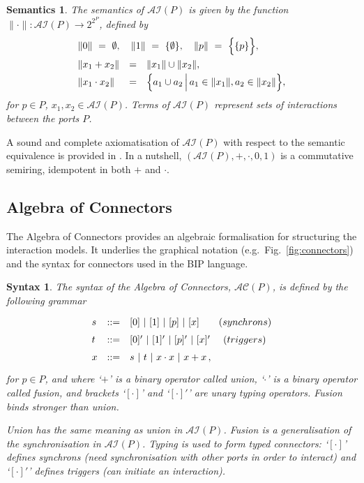 \documentclass{llncs}
\newcommand{\fig}[1]{Fig.~\ref{fig:#1}}
\newcommand{\eg}[1][\ ]{e.g.#1}
\newtheorem*{syntax}{Syntax}
\newtheorem*{semantics}{Semantics}
\newcommand{\ai}{\ensuremath{\mathcal{AI}}}
\newcommand{\ac}{\ensuremath{\mathcal{AC}}}
\begin{document}
\begin{semantics}
The semantics of $\ai(P)$ is given by the function $\|\cdot\| : \ai(P)
\rightarrow 2^{2^P}$, defined by
%
\begin{equation} \label{eq:apsem}
  \renewcommand{\arraystretch}{1.5}
  \begin{array}{lcl}
    \lefteqn{\|0\|\ =\ \emptyset,\quad \|1\|\ =\ \{\emptyset\},\quad
      \|p\|\ =\ \Big\{\{p\}\Big\},}\\
    \|x_1 + x_2\| &=& \|x_1\| \cup \|x_2\|,\\
    \|x_1 \cdot x_2\| &=& 
    \Big\{a_1 \cup a_2\,\Big|\, a_1\in \|x_1\|, a_2\in \|x_2\| \Big\},
  \end{array}
\end{equation}
for $p\in P$, $x_1,x_2\in\ai(P)$.  Terms of $\ai(P)$ represent sets of
interactions between the ports $P$.
\end{semantics}

A sound and complete axiomatisation of $\ai(P)$ with respect to the
semantic equivalence is provided in \cite{BliSif07-acp-emsoft}.  In a
nutshell, $(\ai(P), +, \cdot, 0, 1)$ is a commutative semiring,
idempotent in both $+$ and $\cdot$.



\subsection{Algebra of Connectors}
\label{secn:ac}

The Algebra of Connectors provides an algebraic formalisation for
structuring the interaction models.  It underlies the graphical
notation (\eg \fig{connectors}) and the syntax for connectors used in the BIP language.

\begin{syntax}
The syntax of the {\em Algebra of Connectors}, $\ac(P)$, is defined by the
following grammar
%
\begin{equation} \label{eq:acsynt}
  \renewcommand{\arraystretch}{1.5}
  \begin{array}{lcll}
    s & ::= & [0]\ |\ [1]\ |\ [p]\ |\ [x] \:\:\:\:\:\:\:\:\:(synchrons)\\
    t & ::= & [0]'\ |\ [1]'\ |\ [p]'\ |\ [x]'  \:\:\:\:\:\:   (triggers)\\
    x & ::= & s\ |\ t\ |\ x\cdot x\ |\ x + x\,, 
  \end{array}
\end{equation}
for $p\in P$, and where `$+$' is a binary operator called {\em union},
`$\cdot$' is a binary operator called {\em fusion}, and brackets
`$[\cdot]$' and `$[\cdot]'$' are unary {\em typing} operators.  Fusion
binds stronger than union.

Union has the same meaning as union in $\ai(P)$. Fusion is a
generalisation of the synchronisation in $\ai(P)$.  Typing is used to
form typed connectors: `$[\cdot]$' defines {\em synchrons} (need
synchronisation with other ports in order to interact) and
`$[\cdot]'$' defines {\em triggers} (can initiate an interaction).
\end{syntax}
\end{document}
